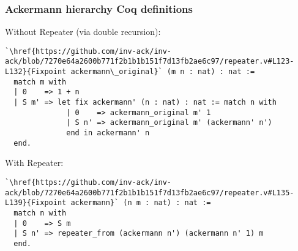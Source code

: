 \begin{frame}[fragile]
\frametitle{Ackermann hierarchy Coq definitions}
Without Repeater (via double recursion):
\begin{lstlisting}
`\href{https://github.com/inv-ack/inv-ack/blob/7270e64a2600b771f2b1b1b151f7d13fb2ae6c97/repeater.v#L123-L132}{Fixpoint ackermann\_original}` (m n : nat) : nat :=
  match m with
  | 0    => 1 + n
  | S m' => let fix ackermann' (n : nat) : nat := match n with
              | 0    => ackermann_original m' 1
              | S n' => ackermann_original m' (ackermann' n')
              end in ackermann' n
  end.
\end{lstlisting}

With Repeater:
\begin{lstlisting}
`\href{https://github.com/inv-ack/inv-ack/blob/7270e64a2600b771f2b1b1b151f7d13fb2ae6c97/repeater.v#L135-L139}{Fixpoint ackermann}` (n m : nat) : nat :=
  match n with
  | 0    => S m
  | S n' => repeater_from (ackermann n') (ackermann n' 1) m
  end.
\end{lstlisting}
\end{frame}

%
